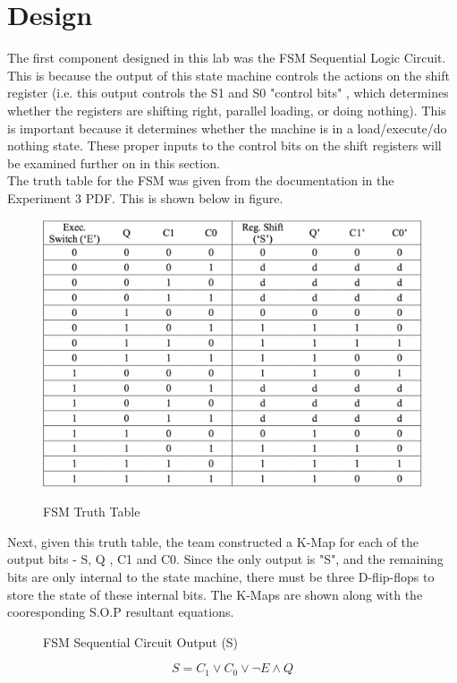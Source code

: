 \documentclass[journal, twocolumn, final,11pt,letterpaper]{IEEEtran}
\begin{document}
\section{Design}
The first component designed in this lab was the FSM Sequential Logic Circuit. This is because the output of this state machine controls the actions on the shift register (i.e. this output controls the S1 and S0 "control bits" , which determines whether the registers are shifting right, parallel loading, or doing nothing). This is important because it determines whether the machine is in a load/execute/do nothing state. These proper inputs to the control bits on the shift registers will be examined further on in this section.\\

The truth table for the FSM was given from the documentation in the Experiment 3 PDF. This is shown below in figure.

\begin{figure} [H]
	\centering
	\includegraphics[scale=0.33]{FSM_Truth_Table.png}
	\label{fig:fsm-truth-table}
	\caption{FSM Truth Table}
\end{figure}       

Next, given this truth table, the team constructed a K-Map for each of the output bits - S, Q , C1 and C0. Since the only output is "S", and the remaining bits are only internal to the state machine, there must be three D-flip-flops to store the state of these internal bits. The K-Maps are shown along with the cooresponding S.O.P resultant equations.

\begin{figure} [H]
	\centering
	\begin{Karnaugh}
	\end{Karnaugh}
	\vspace{-5mm}
	\caption*{FSM Sequential Circuit Output (S)}
\end{figure}
\vspace{-5mm}
\[ S = C_1 \lor C_0 \lor \lnot E \land Q\]\\
\end{document}
